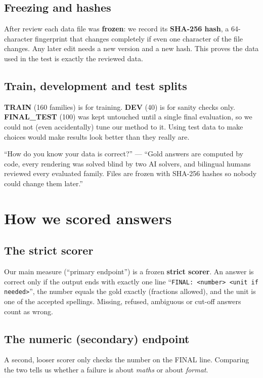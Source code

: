 \documentclass[11pt,a4paper]{article}
\begin{document}
\subsection{Freezing and hashes}
After review each data file was \textbf{frozen}: we record its \textbf{SHA-256 hash}, a 64-character fingerprint that changes completely if even one character of the file changes. Any later edit needs a new version and a new hash. This proves the data used in the test is exactly the reviewed data.

\subsection{Train, development and test splits}
\textbf{TRAIN} (160 families) is for training. \textbf{DEV} (40) is for sanity checks only. \textbf{FINAL\_TEST} (100) was kept untouched until a single final evaluation, so we could not (even accidentally) tune our method to it. Using test data to make choices would make results look better than they really are.

\begin{ifasked}
``How do you know your data is correct?'' --- ``Gold answers are computed by code, every rendering was solved blind by two AI solvers, and bilingual humans reviewed every evaluated family. Files are frozen with SHA-256 hashes so nobody could change them later.''
\end{ifasked}

\section{How we scored answers}

\subsection{The strict scorer}
Our main measure (``primary endpoint'') is a frozen \textbf{strict scorer}. An answer is correct only if the output ends with exactly one line ``\texttt{FINAL: <number> <unit if needed>}'', the number equals the gold exactly (fractions allowed), and the unit is one of the accepted spellings. Missing, refused, ambiguous or cut-off answers count as wrong.

\subsection{The numeric (secondary) endpoint}
A second, looser scorer only checks the number on the FINAL line. Comparing the two tells us whether a failure is about \emph{maths} or about \emph{format}.
\end{document}
